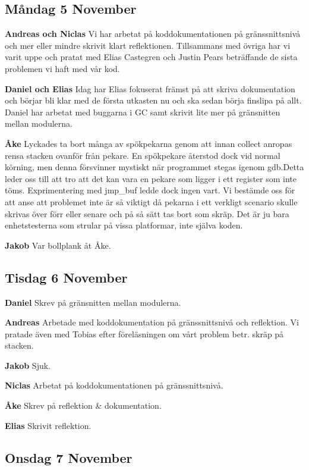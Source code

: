 \documentclass{article}
\begin{document}
\subsection{Måndag 5 November}
{\bf Andreas och Niclas} Vi har arbetat på koddokumentationen på gränssnittsnivå och mer eller mindre skrivit klart reflektionen. Tillsammans med övriga har vi varit uppe och pratat med Elias Castegren och Justin Pears beträffande de sista problemen vi haft med vår kod.

{\bf Daniel och Elias} Idag har Elias fokuserat främst på att skriva dokumentation och börjar bli klar med de första utkasten nu och ska sedan börja finslipa på allt. Daniel har arbetat med buggarna i GC samt skrivit lite mer på gränsnitten mellan modulerna.

{\bf Åke} Lyckades ta bort många av spökpekarna genom att innan collect anropas rensa stacken ovanför från pekare. En spökpekare återstod dock vid normal körning, men denna försvinner mystiskt när programmet stegas igenom gdb.Detta leder oss till att tro att det kan vara en pekare som ligger i ett register som inte töms. Exprimentering med jmp_buf ledde dock ingen vart. Vi bestämde oss för att anse att problemet inte är så viktigt då pekarna i ett verkligt scenario skulle skrivas över förr eller senare och på så sätt tas bort som skräp. Det är ju bara enhetstesterna som strular på vissa platformar, inte själva koden.

{\bf Jakob} Var bollplank åt Åke.

\subsection{Tisdag 6 November}
{\bf Daniel} Skrev på gränsnitten mellan modulerna.

{\bf Andreas} Arbetade med koddokumentation på gränssnittsnivå och reflektion. Vi pratade även med Tobias efter föreläsningen om vårt problem betr. skräp på stacken. 

{\bf Jakob} Sjuk.

{\bf Niclas} Arbetat på koddokumentationen på gränssnittsnivå.

{\bf Åke} Skrev på reflektion & dokumentation.

{\bf Elias} Skrivit reflektion.

\subsection{Onsdag 7 November}

\end{document}
